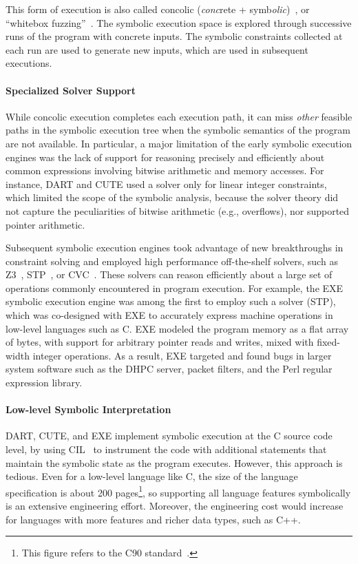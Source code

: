 This form of execution is also called concolic (\emph{conc}rete + symb\emph{olic})~\cite{cute}, or ``whitebox fuz\-zing''~\cite{godefroid:fuzz}.  The symbolic execution space is explored through successive runs of the program with concrete inputs.  The symbolic constraints collected at each run are used to generate new inputs, which are used in subsequent executions.


\paragraph{Specialized Solver Support}

While concolic execution completes each execution path, it can miss \emph{other} feasible paths in the symbolic execution tree when the symbolic semantics of the program are not available.
%
In particular, a major limitation of the early symbolic execution engines was the lack of support for reasoning precisely and efficiently about common expressions involving bitwise arithmetic and memory accesses.
%
For instance, DART and CUTE used a solver only for linear integer constraints, which limited the scope of the symbolic analysis, because the solver theory did not capture the peculiarities of bitwise arithmetic (e.g., overflows), nor supported pointer arithmetic.

Subsequent symbolic execution engines took advantage of new breakthroughs in constraint solving and employed high performance off-the-shelf solvers, such as Z3~\cite{Z3}, STP~\cite{stp}, or CVC~\cite{cvc}.  These solvers can reason efficiently about a large set of operations commonly encountered in program execution.
%
For example, the EXE~\cite{exe} symbolic execution engine was among the first to employ such a solver (STP), which was co-designed with EXE to accurately express machine operations in low-level languages such as C.
%
EXE modeled the program memory as a flat array of bytes, with support for arbitrary pointer reads and writes, mixed with fixed-width integer operations.
%
As a result, EXE targeted and found bugs in larger system software such as the  DHPC server, packet filters, and the  Perl regular expression library.

\paragraph{Low-level Symbolic Interpretation}

DART, CUTE, and EXE implement symbolic execution at the C source code level, by using CIL~\cite{cil} to instrument the code with additional statements that maintain the symbolic state as the program executes.
%
However, this approach is tedious.  Even for a low-level language like C, the size of the language specification is about 200 pages\footnote{This figure refers to the C90 standard~\cite{c90-standard}.}, so supporting all language features symbolically is an extensive engineering effort.  Moreover, the engineering cost would increase for languages with more features and richer data types, such as C++.


